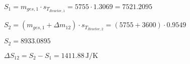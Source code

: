 \( S_1 = m_{ges,1} \cdot s_{T_{Reactor,1}} = 5755 \cdot 1.3069 = 7521.2095 \)  

\( S_2 = (m_{ges,1} + \Delta m_{12}) \cdot s_{T_{Reactor,2}} = (5755 + 3600) \cdot 0.9549 \)  

\( S_2 = 8933.0895 \)  

\( \Delta S_{12} = S_2 - S_1 = 1411.88 \, \text{J/K} \)